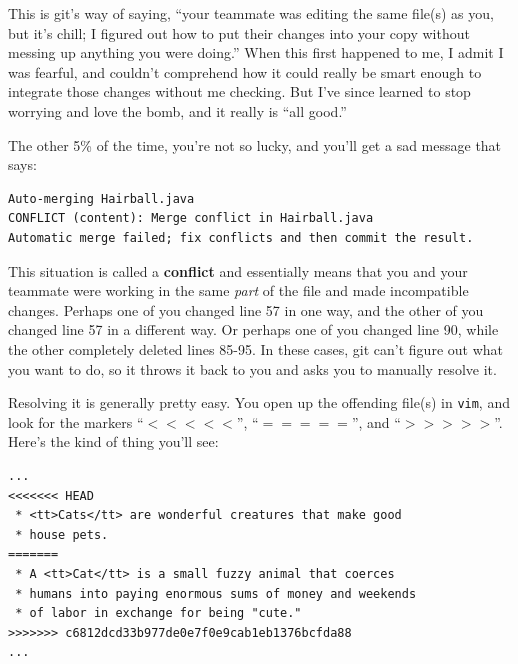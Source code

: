 \begin{itemize}
This is git's way of saying, ``your teammate was editing the same file(s) as
you, but it's chill; I figured out how to put their changes into your copy
without messing up anything you were doing.'' When this first happened to me,
I admit I was fearful, and couldn't comprehend how it could really be smart
enough to integrate those changes without me checking. But I've since learned
to stop worrying and love the bomb, and it really is ``all good.''

The other 5\% of the time, you're not so lucky, and you'll get a sad message
that says:

\begin{Verbatim}[fontsize=\scriptsize,samepage=true,frame=none]
Auto-merging Hairball.java
CONFLICT (content): Merge conflict in Hairball.java
Automatic merge failed; fix conflicts and then commit the result.
\end{Verbatim}

This situation is called a \textbf{conflict} and essentially means that you
and your teammate were working in the same \textit{part} of the file and made
incompatible changes. Perhaps one of you changed line 57 in one way, and the
other of you changed line 57 in a different way. Or perhaps one of you changed
line 90, while the other completely deleted lines 85-95. In these cases, git
can't figure out what you want to do, so it throws it back to you and asks you
to manually resolve it.

Resolving it is generally pretty easy. You open up the offending file(s) in
\texttt{vim}, and look for the markers ``$<<<<<$'', ``$=====$'', and
``$>>>>>$''. Here's the kind of thing you'll see:

\begin{Verbatim}[fontsize=\footnotesize,samepage=true,frame=single]
...
<<<<<<< HEAD
 * <tt>Cats</tt> are wonderful creatures that make good 
 * house pets.
=======
 * A <tt>Cat</tt> is a small fuzzy animal that coerces
 * humans into paying enormous sums of money and weekends
 * of labor in exchange for being "cute."
>>>>>>> c6812dcd33b977de0e7f0e9cab1eb1376bcfda88
...
\end{Verbatim}


\end{itemize}
